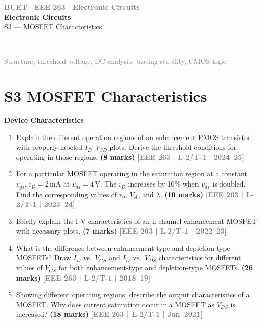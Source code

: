 \documentclass[12pt,a3paper]{article}
\newcommand{\yr}[1]{\hfill\textcolor{gray}{\small\textbf{[#1]}}}
\newcommand{\mk}[1]{\textcolor{orange!70!black}{\small\textbf{(#1 marks)}}}
\newcommand{\subtopic}[2]{%
  \vspace{10pt}
  \noindent\begin{tcolorbox}[colback=#1!8,colframe=#1,boxrule=0.6pt,arc=4pt,
    left=6pt,right=6pt,top=4pt,bottom=4pt]
    \small\bfseries\textcolor{#1}{#2}
  \end{tcolorbox}
  \vspace{2pt}
}
\newcommand{\secdivider}[3]{%
  \newpage\thispagestyle{empty}%
  \vspace*{\fill}%
  \begin{tcolorbox}[enhanced,colback=#3!6,colframe=#3,boxrule=1.5pt,arc=8pt,
    left=20pt,right=20pt,top=22pt,bottom=22pt,
    shadow={3pt}{-3pt}{0pt}{black!15}]
    \centering
    {\large\textcolor{gray}{\textbf{BUET $\cdot$ EEE 263 $\cdot$ Electronic Circuits}}}\\[8pt]
    {\fontsize{26}{32}\selectfont\bfseries\textcolor{#3}{Electronic Circuits}}\\[6pt]
    {\fontsize{15}{19}\selectfont\textcolor{dgray}{#1}}\\[12pt]
    \textcolor{#3!60}{\rule{0.5\textwidth}{0.5pt}}\\[6pt]
    {\small\textcolor{gray}{#2}}
  \end{tcolorbox}%
  \vspace*{\fill}\newpage%
}
\begin{document}
\secdivider{S3 --- MOSFET Characteristics}{Structure, threshold voltage, DC analysis, biasing stability, CMOS logic}{cA}

\label{sec:S3}
\section*{S3 \quad MOSFET Characteristics}

\subtopic{cA}{Device Characteristics}
\label{sub:s3-devchar}

\begin{enumerate}\item Explain the different operation regions of an enhancement PMOS transistor with properly labeled $I_D$--$V_{SD}$ plots. Derive the threshold conditions for operating in those regions.
\mk{8} \yr{EEE 263 | L-2/T-1 | 2024--25}

\item For a particular MOSFET operating in the saturation region at a constant $v_{gs}$, $i_D=2\,\text{mA}$ at $v_{ds}=4\,\text{V}$. The $i_D$ increases by 10\% when $v_{ds}$ is doubled. Find the corresponding values of $r_0$, $V_A$, and $\lambda$.
\mk{10} \yr{EEE 263 | L-2/T-1 | 2023--24}

\item Briefly explain the I-V characteristics of an n-channel enhancement MOSFET with necessary plots.
\mk{7} \yr{EEE 263 | L-2/T-1 | 2022--23}

\item What is the difference between enhancement-type and depletion-type MOSFETs? Draw $I_D$ vs.\ $V_{GS}$ and $I_D$ vs.\ $V_{DS}$ characteristics for different values of $V_{GS}$ for both enhancement-type and depletion-type MOSFETs.
\mk{26} \yr{EEE 263 | L-2/T-1 | 2018--19}

\item Showing different operating regions, describe the output characteristics of a MOSFET. Why does current saturation occur in a MOSFET as $V_{DS}$ is increased?
\mk{18} \yr{EEE 263 | L-2/T-1 | Jan--2021}

\end{enumerate}
\end{document}
